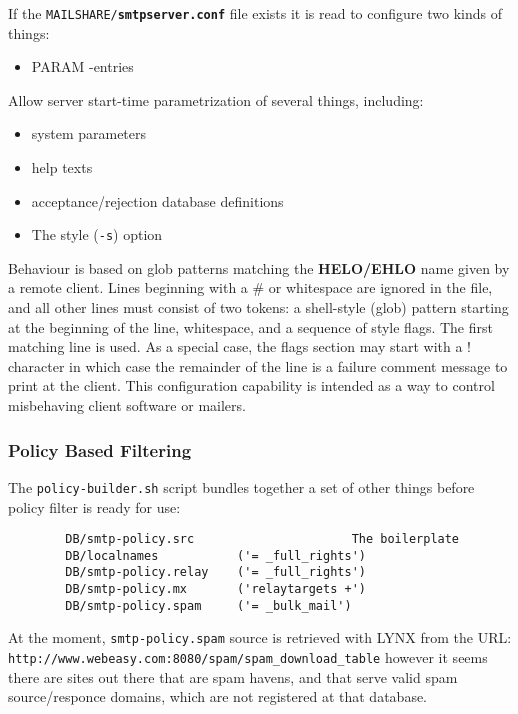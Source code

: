 If the {\tt MAILSHARE/{\bf smtpserver.conf}} file exists it is read 
to configure two kinds of things:

\begin{itemize}
\item  PARAM -entries
\end{itemize}


Allow server start-time parametrization of several things, including:

\begin{itemize}
\item  system parameters
\item  help texts
\item  acceptance/rejection database definitions
\item The style ({\tt -s}) option
\end{itemize}


Behaviour is based on glob patterns matching the 
{\bf HELO/EHLO} name given by a remote client. Lines 
beginning with a \# or whitespace are ignored in the file, and 
all other lines must consist of two tokens: a shell-style (glob) 
pattern starting at the beginning of the line, whitespace, and a 
sequence of style flags. The first matching line is used. As a 
special case, the flags section may start with a ! character in 
which case the remainder of the line is a failure comment message 
to print at the client. This configuration capability is intended 
as a way to control misbehaving client software or mailers.






\subsubsection{Policy Based Filtering}



The {\tt policy-builder.sh} script bundles together a set of other
things before policy filter is ready for use:

\begin{verbatim}
        DB/smtp-policy.src                      The boilerplate
        DB/localnames           ('= _full_rights')
        DB/smtp-policy.relay    ('= _full_rights')
        DB/smtp-policy.mx       ('relaytargets +')
        DB/smtp-policy.spam     ('= _bulk_mail')
\end{verbatim}


At the moment, {\tt smtp-policy.spam} source is retrieved with LYNX from
the URL: {\tt http://www.webeasy.com:8080/spam/spam\_download\_table}
however it seems there are sites out there that are spam havens, and
that serve valid spam source/responce domains, which are not registered
at that database.


